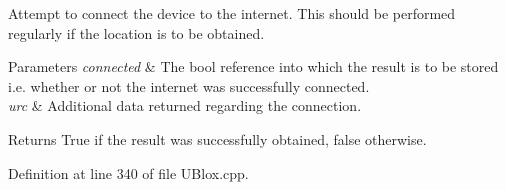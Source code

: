 Attempt to connect the device to the internet. This should be performed regularly if the location is to be obtained.


\begin{DoxyParams}{Parameters}
{\em connected} & The bool reference into which the result is to be stored i.\+e. whether or not the internet was successfully connected. \\
\hline
{\em urc} & Additional data returned regarding the connection. \\
\hline
\end{DoxyParams}
\begin{DoxyReturn}{Returns}
True if the result was successfully obtained, false otherwise. 
\end{DoxyReturn}


Definition at line 340 of file U\+Blox.\+cpp.


